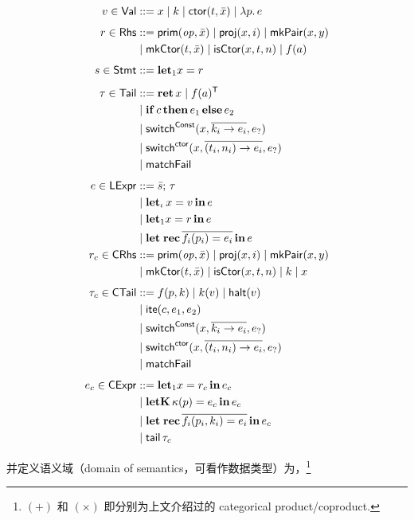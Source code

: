\documentclass[a4paper, 11pt]{article}
\theoremstyle{remark}\newtheorem*{remark}{Remark}
\theoremstyle{definition}\newtheorem*{definition}{Definition}
\begin{document}
\begingroup\allowdisplaybreaks
\begin{align*}
  v \in \mathsf{Val} &::= x \mid k \mid \mathsf{ctor}(t, \bar{x}) \mid \lambda p.\, e \\[4pt]
  r \in \mathsf{Rhs} &::= \mathsf{prim}(\mathit{op}, \bar{x}) \mid \mathsf{proj}(x, i) \mid \mathsf{mkPair}(x, y) \\
  &\mid \mathsf{mkCtor}(t, \bar{x}) \mid \mathsf{isCtor}(x, t, n) \mid f(a) \\[4pt]
  s \in \mathsf{Stmt} &::= \mathbf{let}_1 x = r \\[4pt]
  \tau \in \mathsf{Tail} &::=\mathbf{ret}\, x \mid f(a)^{\mathsf{T}}\\
  &\mid \mathbf{if}\, c\, \mathbf{then}\, e_1\, \mathbf{else}\, e_2 \\
  &\mid \mathsf{switch}^{\mathsf{Const}}(x, \overline{k_i \to e_i}, e_?) \\
  &\mid \mathsf{switch}^{\mathsf{ctor}}(x, \overline{(t_i, n_i) \to e_i}, e_?) \\
  &\mid \mathsf{matchFail} \\[4pt]
  e \in \mathsf{LExpr} &::=\bar{s};\, \tau \\
  &\mid \mathbf{let}_\iota\, x = v\, \mathbf{in}\, e \\
  &\mid \mathbf{let}_1 x = r\, \mathbf{in}\, e \\
  &\mid \mathbf{let\;rec}\, \overline{f_i(p_i) = e_i}\, \mathbf{in}\, e\\
  r_c \in \mathsf{CRhs} &::=\mathsf{prim}(\mathit{op}, \bar{x}) \mid \mathsf{proj}(x, i) \mid \mathsf{mkPair}(x, y) \\
  &\mid \mathsf{mkCtor}(t, \bar{x}) \mid \mathsf{isCtor}(x, t, n) \mid k \mid x \\[4pt]
  \tau_c \in \mathsf{CTail} &::=f(p, k) \mid k(v) \mid \mathsf{halt}(v) \\
  &\mid \mathsf{ite}(c, e_1, e_2) \\
  &\mid \mathsf{switch}^{\mathsf{Const}}(x, \overline{k_i \to e_i}, e_?) \\
  &\mid \mathsf{switch}^{\mathsf{ctor}}(x, \overline{(t_i, n_i) \to e_i}, e_?) \\
  &\mid \mathsf{matchFail} \\[4pt]
  e_c \in \mathsf{CExpr} &::=\mathbf{let}_1 x = r_c\, \mathbf{in}\, e_c \\
  &\mid \mathbf{letK}\, \kappa(p) = e_c\, \mathbf{in}\, e_c \\
  &\mid \mathbf{let\;rec}\, \overline{f_i(p_i, k_i) = e_i}\, \mathbf{in}\, e_c \\
  &\mid \mathsf{tail}\, \tau_c
\end{align*}\endgroup

并定义语义域（domain of semantics，可看作数据类型）为，\footnote{
  $(+)$ 和 $(\times)$ 即分别为上文介绍过的 categorical product/coproduct.
}
\end{document}
